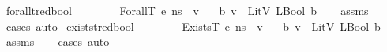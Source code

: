 \begin{isabellebody}
\isamarkupfalse%
%
\endisatagproof
{\isafoldproof}%
%
\isadelimproof
\isanewline
%
\endisadelimproof
\isanewline
\isanewline
{}\isamarkupfalse%
\ forallt{\isacharunderscore}{\kern0pt}red{\isacharunderscore}{\kern0pt}bool{\isacharcolon}{\kern0pt}\isanewline
\ \ \ {\isachardoublequoteopen}\ {\isasymLambda}{\isacharcomma}{\kern0pt}\ {\isasymGamma}{\isacharcomma}{\kern0pt}\ {\isasymOmega}\ {\isasymturnstile}\ {\isasymlangle}ForallT\ e{\isacharcomma}{\kern0pt}\ n{\isacharunderscore}{\kern0pt}s{\isasymrangle}\ {\isasymDown}\ v{\isachardoublequoteclose}\isanewline
\ \ \ {\isachardoublequoteopen}{\isasymexists}b{\isachardot}{\kern0pt}\ {\isacharparenleft}{\kern0pt}v\ {\isacharequal}{\kern0pt}\ LitV\ {\isacharparenleft}{\kern0pt}LBool\ b{\isacharparenright}{\kern0pt}{\isacharparenright}{\kern0pt}{\isachardoublequoteclose}\isanewline
%
\isadelimproof
\ \ %
\endisadelimproof
%
\isatagproof
{}\isamarkupfalse%
\ assms\isanewline
\ \ \isamarkupfalse%
\ {\isacharparenleft}{\kern0pt}cases{\isacharsemicolon}{\kern0pt}\ auto{\isacharparenright}{\kern0pt}%
\endisatagproof
{\isafoldproof}%
%
\isadelimproof
\isanewline
%
\endisadelimproof
\isanewline
\isanewline
{}\isamarkupfalse%
\ existst{\isacharunderscore}{\kern0pt}red{\isacharunderscore}{\kern0pt}bool{\isacharcolon}{\kern0pt}\isanewline
\ \ \ {\isachardoublequoteopen}\ {\isasymLambda}{\isacharcomma}{\kern0pt}\ {\isasymGamma}{\isacharcomma}{\kern0pt}\ {\isasymOmega}\ {\isasymturnstile}\ {\isasymlangle}ExistsT\ e{\isacharcomma}{\kern0pt}\ n{\isacharunderscore}{\kern0pt}s{\isasymrangle}\ {\isasymDown}\ v{\isachardoublequoteclose}\isanewline
\ \ \ {\isachardoublequoteopen}{\isasymexists}b{\isachardot}{\kern0pt}\ {\isacharparenleft}{\kern0pt}v\ {\isacharequal}{\kern0pt}\ LitV\ {\isacharparenleft}{\kern0pt}LBool\ b{\isacharparenright}{\kern0pt}{\isacharparenright}{\kern0pt}{\isachardoublequoteclose}\isanewline
%
\isadelimproof
\ \ %
\endisadelimproof
%
\isatagproof
{}\isamarkupfalse%
\ assms\isanewline
\ \ \isamarkupfalse%
\ {\isacharparenleft}{\kern0pt}cases{\isacharsemicolon}{\kern0pt}\ auto{\isacharparenright}{\kern0pt}%
\endisatagproof
{\isafoldproof}%
%
\isadelimproof
\isanewline
%
\endisadelimproof
\isanewline
{}\isamarkupfalse%
\ \ \isanewline
%
\isadelimtheory
\isanewline
%
\endisadelimtheory
%
\isatagtheory
{}\isamarkupfalse%
%
\endisatagtheory
{\isafoldtheory}%
%
\isadelimtheory
%
\endisadelimtheory
%
\end{isabellebody}%
